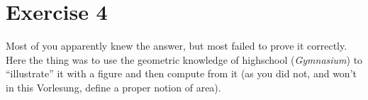 \section{Exercise 4}

Most of you apparently knew the answer, but most failed to prove it correctly. Here the thing was to use the geometric knowledge of highschool (\textit{Gymnasium}) to ``illustrate'' it with a figure and then compute from it (as you did not, and won't in this Vorlesung, define a proper notion of area).
